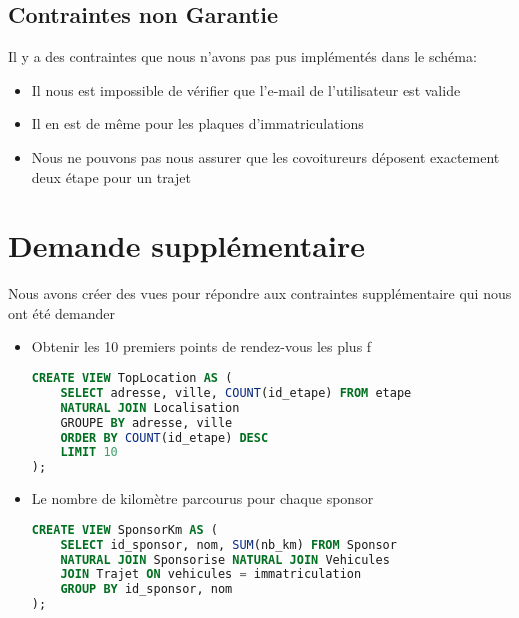 	\subsection{Contraintes non Garantie}
	Il y a des contraintes que nous n'avons pas pus implémentés dans le schéma:
	\begin{itemize}
		\item Il nous est impossible de vérifier que l'e-mail de l'utilisateur est valide
		\item Il en est de même pour les plaques d'immatriculations 
		\item  Nous ne pouvons pas nous assurer que les covoitureurs  déposent exactement deux étape pour un trajet
	\end{itemize}
	\pagebreak
	\section{Demande supplémentaire}
	Nous avons créer des vues pour répondre aux contraintes supplémentaire qui nous ont été demander
	\begin{itemize}
		\item Obtenir les 10 premiers points de rendez-vous les plus f
		\begin{lstlisting}[language=SQL]
CREATE VIEW TopLocation AS (
	SELECT adresse, ville, COUNT(id_etape) FROM etape
	NATURAL JOIN Localisation
	GROUPE BY adresse, ville
	ORDER BY COUNT(id_etape) DESC
	LIMIT 10
);
		\end{lstlisting}
		\item Le nombre de kilomètre parcourus pour chaque sponsor
		\begin{lstlisting}[language=SQL]
CREATE VIEW SponsorKm AS (
	SELECT id_sponsor, nom, SUM(nb_km) FROM Sponsor
	NATURAL JOIN Sponsorise NATURAL JOIN Vehicules
	JOIN Trajet ON vehicules = immatriculation
	GROUP BY id_sponsor, nom
);
		\end{lstlisting}
	\end{itemize}
	

 